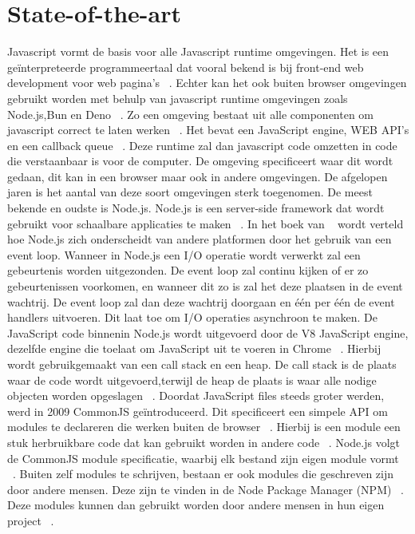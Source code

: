 \section{State-of-the-art}%
\label{sec:state-of-the-art}
Javascript vormt de basis voor alle Javascript runtime omgevingen. 
Het is een geïnterpreteerde programmeertaal dat vooral bekend is bij front-end web development voor web pagina's ~\autocite{Mozilla2023}.
Echter kan het ook buiten browser omgevingen gebruikt worden met behulp van javascript runtime omgevingen zoals Node.js,Bun en Deno ~\autocite{Mozilla2023}.
Zo een omgeving bestaat uit alle componenten om javascript correct te laten werken ~\autocite{Christopher}. 
Het bevat een JavaScript engine, WEB API's en een callback queue ~\autocite{Christopher}. 
Deze runtime zal dan javascript code omzetten in code die verstaanbaar is voor de computer.
De omgeving specificeert waar dit wordt gedaan, dit kan in een browser maar ook in andere omgevingen.
De afgelopen jaren is het aantal van deze soort omgevingen sterk toegenomen. 
De meest bekende en oudste is Node.js. 
Node.js is een server-side framework dat wordt gebruikt voor schaalbare applicaties te maken ~\autocite{Gackenheimer2013}.
In het boek van ~\textcite{Ali2013} wordt verteld hoe Node.js zich onderscheidt van andere platformen door het gebruik van een event loop. 
Wanneer in Node.js een I/O operatie wordt verwerkt zal een gebeurtenis worden uitgezonden. 
De event loop zal continu kijken of er zo gebeurtenissen voorkomen, 
en wanneer dit zo is zal het deze plaatsen in de event wachtrij. 
De event loop zal dan deze wachtrij doorgaan en één per één de event handlers uitvoeren. 
Dit laat toe om I/O operaties asynchroon te maken.
De JavaScript code binnenin Node.js wordt uitgevoerd door de V8 JavaScript engine, 
dezelfde engine die toelaat om JavaScript uit te voeren in Chrome ~\autocite{Syed2014}.
Hierbij wordt gebruikgemaakt van een call stack en een heap. 
De call stack is de plaats waar de code wordt uitgevoerd,terwijl de heap de plaats is waar alle nodige objecten worden opgeslagen ~\autocite{Christopher}.
Doordat JavaScript files steeds groter werden, werd in 2009 CommonJS geïntroduceerd. 
Dit specificeert een simpele API om modules te declareren die werken buiten de browser ~\autocite{Osmani2012}.
Hierbij is een module een stuk herbruikbare code dat kan gebruikt worden in  andere code ~\autocite{Osmani2012}.
Node.js volgt de CommonJS module specificatie, waarbij elk bestand zijn eigen module vormt ~\autocite{Syed2014}.
Buiten zelf modules te schrijven, bestaan er ook modules die geschreven zijn door andere mensen. 
Deze zijn te vinden in de Node Package Manager (NPM) ~\autocite{Wittern2016}. 
Deze modules kunnen dan gebruikt worden door andere mensen in hun eigen project ~\autocite{Ali2013}.

